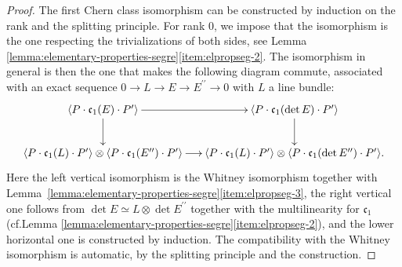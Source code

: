 \documentclass[11pt]{article}
\providecommand{\cf}{\textup{cf.}}
\theoremstyle{plain}
\theoremstyle{definition}
\newcommand{\cfrak}{\mathfrak c}
\newcommand{\bis}{\prime\prime}
\begin{document}
\begin{proof}
The first Chern class isomorphism can be constructed by induction on the rank and the splitting principle. For rank 0, we impose that the isomorphism is the one respecting the trivializations of both sides, see Lemma \ref{lemma:elementary-properties-segre}\eqref{item:elpropseg-2}. The isomorphism in general is then the one that makes the following diagram commute, associated with an exact sequence $0 \to L \to E \to E^{\bis} \to 0$ with $L$ a line bundle:
\begin{equation}\label{eq:firstChernclassisodef}
\begin{array}{c}
\xymatrix@C=.5cm{\langle P\cdot \cfrak_1(E)\cdot P'\rangle \ar[r] \ar[d] & \langle P\cdot\cfrak_1(\det E)\cdot P'\rangle \ar[d] \\
\langle P \cdot \cfrak_1(L) \cdot P'\rangle \otimes \langle P \cdot \cfrak_1(E^{\bis}) \cdot P' \rangle \ar[r] & \langle P \cdot \cfrak_1(L ) \cdot P' \rangle \otimes \langle P \cdot \cfrak_1(\det E^{\bis} ) \cdot P' \rangle.
}
\end{array}
\end{equation}
Here the left vertical isomorphism is the Whitney isomorphism together with Lem\-ma~\ref{lemma:elementary-properties-segre}\eqref{item:elpropseg-3}, the right vertical one follows from $\det E\simeq L\otimes\det E^{\bis}$ together with the multilinearity for $\cfrak_{1}$ (\cf Lemma \ref{lemma:elementary-properties-segre}\eqref{item:elpropseg-2}), and the lower horizontal one is constructed by induction. The compatibility with the Whitney isomorphism is automatic, by the splitting principle and the construction.


\end{proof}
\end{document}
